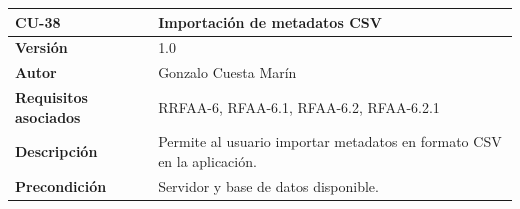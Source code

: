 \documentclass[
]{article}
\begin{document}
\begin{longtable}[]{@{}ll@{}}
\toprule
\begin{minipage}[b]{0.20\columnwidth}\raggedright
\textbf{CU-38}\strut
\end{minipage} & \begin{minipage}[b]{0.75\columnwidth}\raggedright
\textbf{Importación de metadatos CSV}\strut
\end{minipage}\tabularnewline
\midrule
\endhead
\begin{minipage}[t]{0.20\columnwidth}\raggedright
\textbf{Versión}\strut
\end{minipage} & \begin{minipage}[t]{0.75\columnwidth}\raggedright
1.0\strut
\end{minipage}\tabularnewline
\begin{minipage}[t]{0.20\columnwidth}\raggedright
\textbf{Autor}\strut
\end{minipage} & \begin{minipage}[t]{0.75\columnwidth}\raggedright
Gonzalo Cuesta Marín\strut
\end{minipage}\tabularnewline
\begin{minipage}[t]{0.20\columnwidth}\raggedright
\textbf{Requisitos asociados}\strut
\end{minipage} & \begin{minipage}[t]{0.75\columnwidth}\raggedright
RRFAA-6, RFAA-6.1, RFAA-6.2, RFAA-6.2.1\strut
\end{minipage}\tabularnewline
\begin{minipage}[t]{0.20\columnwidth}\raggedright
\textbf{Descripción}\strut
\end{minipage} & \begin{minipage}[t]{0.75\columnwidth}\raggedright
Permite al usuario importar metadatos en formato CSV en la
aplicación.\strut
\end{minipage}\tabularnewline
\begin{minipage}[t]{0.20\columnwidth}\raggedright
\textbf{Precondición}\strut
\end{minipage} & \begin{minipage}[t]{0.75\columnwidth}\raggedright
Servidor y base de datos disponible.


\end{minipage}
\end{longtable}
\end{document}
